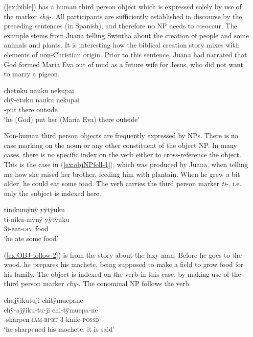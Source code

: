 (\ref{ex:bible}) has a human third person object which is expressed solely by use of the marker \textit{chÿ-}. All participants are sufficiently established in discourse by the preceding sentences (in Spanish), and therefore no NP needs to co-occur. The example stems from Juana telling Swintha about the creation of people and some animals and plants. It is interesting how the biblical creation story mixes with elements of non-Christian origin. Prior to this sentence, Juana had narrated that God formed María Eva out of mud as a future wife for Jesus, who did not want to marry a pigeon.

\ea\label{ex:bible}
\begingl
\glpreamble chetuku nauku nekupai\\
\gla chÿ-etuku nauku nekupai\\
-put there outside\\
\glft ‘he (God) put her (María Eva) there outside’
\endgl
\trailingcitation{[jxx-n101013s-1.359]}
\xe
{}

Non-human third person objects are frequently expressed by NPs. There is no case marking on the noun or any other constituent of the object NP. In many cases, there is no specific index on the verb either to cross-reference the object. This is the case in (\ref{ex:objNPfoll-1}), which was produced by Juana, when telling me how she raised her brother, feeding him with plantain. When he grew a bit older, he could eat some food. The verb carries the third person marker \textit{ti-}, i.e. only the subject is indexed here. 


\ea\label{ex:objNPfoll-1}
\begingl 
\glpreamble tinikumÿnÿ yÿtÿuku\\
\gla ti-niku-mÿnÿ yÿtÿuku\\ 
\glb 3i-eat-\textsc{dim} food\\ 
\glft ‘he ate some food’
\trailingcitation{[jxx-p120430l-2.486]}
\xe

(\ref{ex:OBJ-follow-2}) is from the story about the lazy man. Before he goes to the wood, he prepares his machete, being supposed to make a field to grow food for his family. The object is indexed on the verb in this case, by making use of the third person marker \textit{chÿ-}. The conominal NP follows the verb.

\ea\label{ex:OBJ-follow-2}
\begingl 
\glpreamble chajÿikutuji chitÿmuepane\\
\gla chÿ-ajÿiku-tu-ji chi-tÿmuepa-ne\\
-sharpen-\textsc{iam}-\textsc{rprt} 3-knife-\textsc{possd}\\ 
\glft ‘he sharpened his machete, it is said’
\trailingcitation{[mox-n110920l.021]}
\xe

